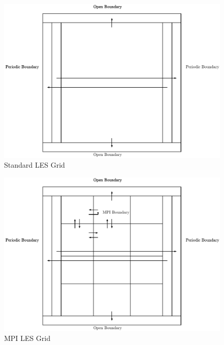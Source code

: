 \documentclass{article}
\begin{document}
\begin{figure}
    \includegraphics[width=\linewidth]{Diagrams/standardLESGrid.pdf}
    \caption{Standard LES Grid}
    \label{fig:standardLESGrid}
\end{figure}

\begin{figure}
    \includegraphics[width=\linewidth]{Diagrams/mpiLESGrid.pdf}
    \caption{MPI LES Grid}
    \label{fig:mpiLESGrid}
\end{figure}
\end{document}
